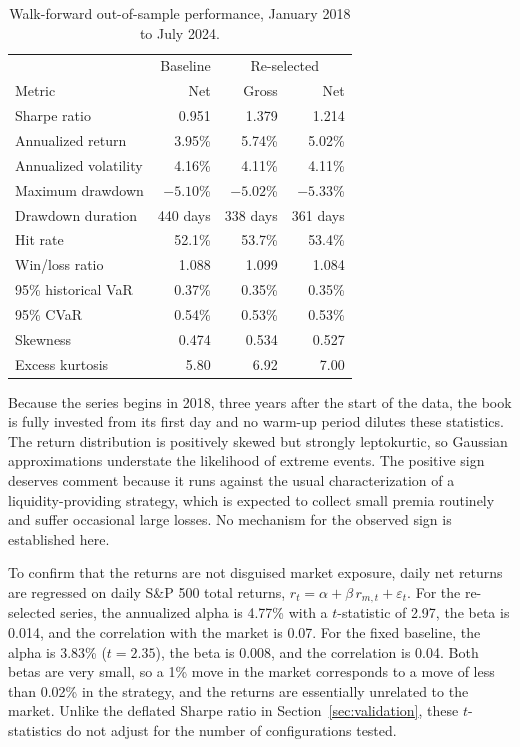 \documentclass[11pt]{article}
\begin{document}
\begin{table}[t]
\centering
\caption{Walk-forward out-of-sample performance, January 2018 to July 2024.}
\label{tab:performance}
\begin{tabular}{lrrr}
\toprule
 & Baseline & \multicolumn{2}{c}{Re-selected} \\
Metric & Net & Gross & Net \\
\midrule
Sharpe ratio & 0.951 & 1.379 & 1.214 \\
Annualized return & 3.95\% & 5.74\% & 5.02\% \\
Annualized volatility & 4.16\% & 4.11\% & 4.11\% \\
Maximum drawdown & $-5.10$\% & $-5.02$\% & $-5.33$\% \\
Drawdown duration & 440 days & 338 days & 361 days \\
Hit rate & 52.1\% & 53.7\% & 53.4\% \\
Win/loss ratio & 1.088 & 1.099 & 1.084 \\
95\% historical VaR & 0.37\% & 0.35\% & 0.35\% \\
95\% CVaR & 0.54\% & 0.53\% & 0.53\% \\
Skewness & 0.474 & 0.534 & 0.527 \\
Excess kurtosis & 5.80 & 6.92 & 7.00 \\
\bottomrule
\end{tabular}
\end{table}

Because the series begins in 2018, three years after the start of the data, the book is fully invested from its first day and no warm-up period dilutes these statistics. The return distribution is positively skewed but strongly leptokurtic, so Gaussian approximations understate the likelihood of extreme events. The positive sign deserves comment because it runs against the usual characterization of a liquidity-providing strategy, which is expected to collect small premia routinely and suffer occasional large losses. No mechanism for the observed sign is established here.

To confirm that the returns are not disguised market exposure, daily net returns are regressed on daily S\&P 500 total returns, $r_t=\alpha+\beta\,r_{m,t}+\varepsilon_t$. For the re-selected series, the annualized alpha is 4.77\% with a $t$-statistic of 2.97, the beta is 0.014, and the correlation with the market is 0.07. For the fixed baseline, the alpha is 3.83\% ($t=2.35$), the beta is 0.008, and the correlation is 0.04. Both betas are very small, so a 1\% move in the market corresponds to a move of less than 0.02\% in the strategy, and the returns are essentially unrelated to the market. Unlike the deflated Sharpe ratio in Section~\ref{sec:validation}, these $t$-statistics do not adjust for the number of configurations tested.
\end{document}
